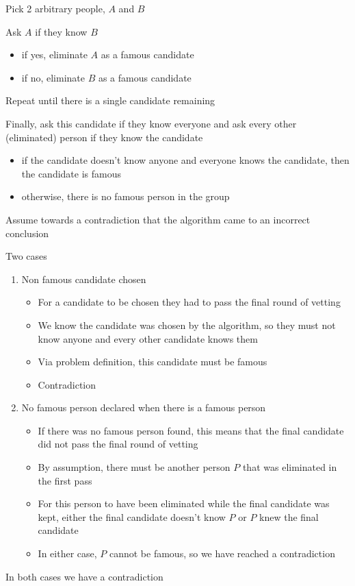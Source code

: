 \algorithm
{
    \item Pick 2 arbitrary people, $A$ and $B$
    \item Ask $A$ if they know $B$
        \begin{itemize}
            \item if yes, eliminate $A$ as a famous candidate
            \item if no, eliminate $B$ as a famous candidate
        \end{itemize}
    \item Repeat until there is a single candidate remaining
    \item Finally, ask this candidate if they know everyone and ask every other (eliminated) person if they know the candidate
        \begin{itemize}
            \item if the candidate doesn't know anyone and everyone knows the candidate, then the candidate is famous
            \item otherwise, there is no famous person in the group
        \end{itemize}
}
{
    \item Assume towards a contradiction that the algorithm came to an incorrect conclusion
    \item Two cases
    \begin{enumerate}
        \item Non famous candidate chosen
            \begin{itemize}
                \item For a candidate to be chosen they had to pass the final round of vetting
                \item We know the candidate was chosen by the algorithm, so they must not know anyone and every other candidate knows them
                \item Via problem definition, this candidate must be famous
                \item Contradiction
            \end{itemize}
        \item No famous person declared when there is a famous person
            \begin{itemize}
                \item If there was no famous person found, this means that the final candidate did not pass the final round of vetting
                \item By assumption, there must be another person $P$ that was eliminated in the first pass
                \item For this person to have been eliminated while the final candidate was kept, either the final candidate doesn't know $P$ or $P$ knew the final candidate
                \item In either case, $P$ cannot be famous, so we have reached a contradiction
            \end{itemize}
    \end{enumerate}
    \item In both cases we have a contradiction        
}
